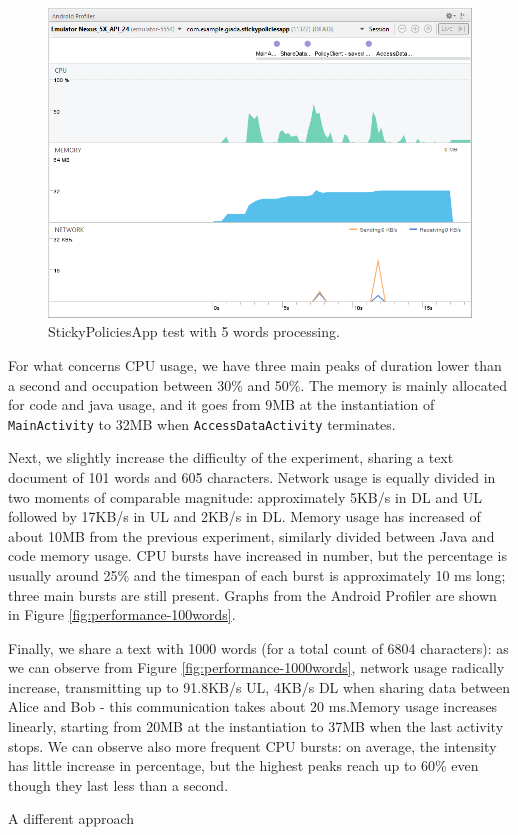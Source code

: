 \begin{figure}
	\centering
	\includegraphics[width=0.95\linewidth]{Performance-5words.png}
	\caption{StickyPoliciesApp test with 5 words processing.}
	\label{fig:performance-5words}
\end{figure}

For what concerns CPU usage, we have three main peaks of duration lower than a second and occupation between 30\% and 50\%. The memory is mainly allocated for code and java usage, and it goes from 9MB at the instantiation of \texttt{MainActivity} to 32MB when \texttt{AccessDataActivity} terminates.

Next, we slightly increase the difficulty of the experiment, sharing a text document of 101 words and 605 characters. Network usage is equally divided in two moments of comparable magnitude: approximately 5KB/s in DL and UL followed by 17KB/s in UL and 2KB/s in DL. Memory usage has increased of about 10MB from the previous experiment, similarly divided between Java and code memory usage. CPU bursts have increased in number, but the percentage is usually around 25\% and the timespan of each burst is approximately 10 ms long; three main bursts are still present. Graphs from the Android Profiler are shown in Figure \ref{fig:performance-100words}.

Finally, we share a text with 1000 words (for a total count of 6804 characters): as we can observe from Figure \ref{fig:performance-1000words}, network usage radically increase, transmitting up to 91.8KB/s UL, 4KB/s DL when sharing data between Alice and Bob - this communication takes about 20 ms.Memory usage increases linearly, starting from 20MB at the instantiation to 37MB when the last activity stops. We can observe also more frequent CPU bursts: on average, the intensity has little increase in percentage, but the highest peaks reach up to 60\% even though they last less than a second.

A different approach